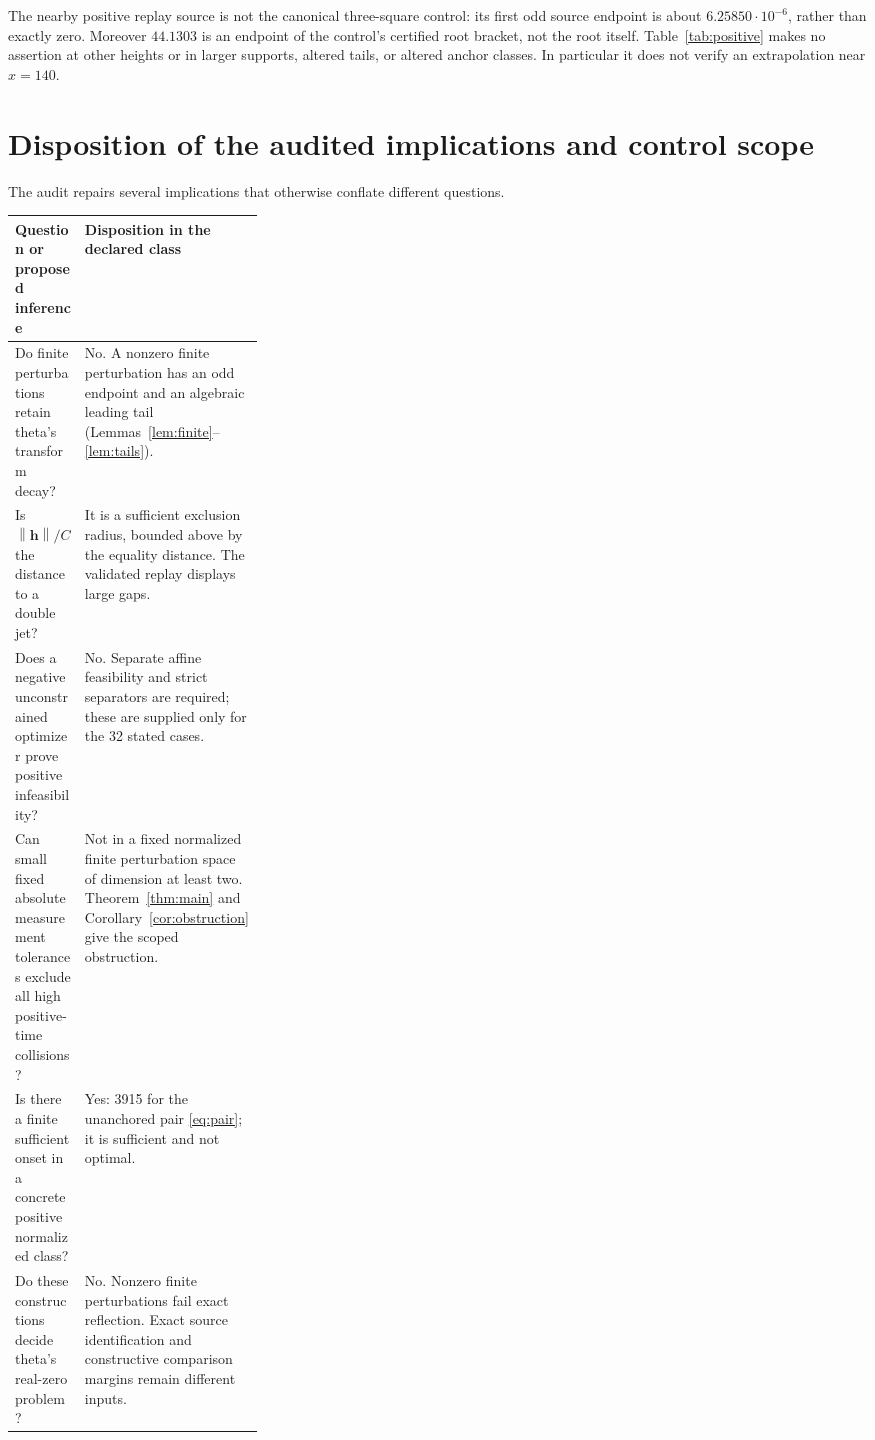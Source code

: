 \documentclass[11pt]{article}
\theoremstyle{remark}\newtheorem{remark}[theorem]{Remark}
\newcommand{\norm}[1]{\left\lVert #1\right\rVert}
\newcommand{\jet}{\mathbf h}
\begin{document}
The nearby positive replay source is not the canonical three-square control: its first odd source endpoint is about $6.25850\cdot10^{-6}$, rather than exactly zero. Moreover $44.1303$ is an endpoint of the control's certified root bracket, not the root itself. Table~\ref{tab:positive} makes no assertion at other heights or in larger supports, altered tails, or altered anchor classes. In particular it does not verify an extrapolation near $x=140$.

\section{Disposition of the audited implications and control scope}\label{sec:scope}
The audit repairs several implications that otherwise conflate different questions.
\begin{center}\small
\begin{tabularx}{\linewidth}{@{}p{0.29\linewidth}X@{}}
\toprule
Question or proposed inference&Disposition in the declared class\\\midrule
Do finite perturbations retain theta's transform decay?&No. A nonzero finite perturbation has an odd endpoint and an algebraic leading tail (Lemmas~\ref{lem:finite}--\ref{lem:tails}).\\[3pt]
Is $\norm\jet/C$ the distance to a double jet?&It is a sufficient exclusion radius, bounded above by the equality distance. The validated replay displays large gaps.\\[3pt]
Does a negative unconstrained optimizer prove positive infeasibility?&No. Separate affine feasibility and strict separators are required; these are supplied only for the 32 stated cases.\\[3pt]
Can small fixed absolute measurement tolerances exclude all high positive-time collisions?&Not in a fixed normalized finite perturbation space of dimension at least two. Theorem~\ref{thm:main} and Corollary~\ref{cor:obstruction} give the scoped obstruction.\\[3pt]
Is there a finite sufficient onset in a concrete positive normalized class?&Yes: 3915 for the unanchored pair \eqref{eq:pair}; it is sufficient and not optimal.\\[3pt]
Do these constructions decide theta's real-zero problem?&No. Nonzero finite perturbations fail exact reflection. Exact source identification and constructive comparison margins remain different inputs.\\\bottomrule
\end{tabularx}
\end{center}
\end{document}
